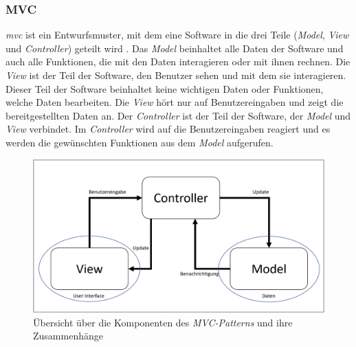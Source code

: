 \subsubsection{MVC}
\textit{\Gls{mvc}} ist ein Entwurfsmuster, mit dem eine Software in die drei Teile (\textit{Model}, \textit{View} und \textit{Controller}) geteilt wird \cite{mvc}. Das \textit{Model} beinhaltet alle Daten der Software und auch alle Funktionen, die mit den Daten interagieren oder mit ihnen rechnen. Die \textit{View} ist der Teil der Software, den Benutzer sehen und mit dem sie interagieren. Dieser Teil der Software beinhaltet keine wichtigen Daten oder Funktionen, welche Daten bearbeiten. Die \textit{View} hört nur auf Benutzereingaben und zeigt die bereitgestellten Daten an. Der \textit{Controller} ist der Teil der Software, der \textit{Model} und \textit{View} verbindet. Im \textit{Controller} wird auf die Benutzereingaben reagiert und es werden die gewünschten Funktionen aus dem \textit{Model} aufgerufen.
\begin{figure}[H]
	\centering
	\includegraphics[width=0.75\linewidth]{images/rfoster_study/mvc}
	\caption[Übersicht des \textit{MVC-Patterns}]{Übersicht über die Komponenten des \textit{MVC-Patterns} und ihre Zusammenhänge}
	\label{fig:mvc}
\end{figure}

